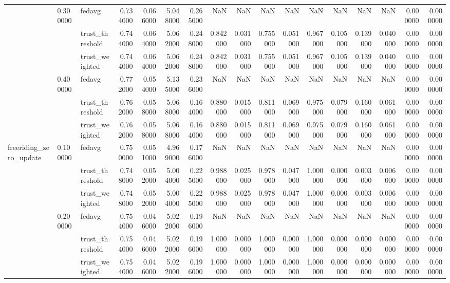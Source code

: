 \begin{tabular}{lllrrrrrrrrrrrrrr}
\cline{2-17}
 & \multirow[t]{3}{*}{0.300000} & fedavg & 0.734000 & 0.066000 & 5.048000 & 0.265000 & NaN & NaN & NaN & NaN & NaN & NaN & NaN & NaN & 0.000000 & 0.000000 \\
 &  & trust_threshold & 0.744000 & 0.064000 & 5.062000 & 0.248000 & 0.842000 & 0.031000 & 0.755000 & 0.051000 & 0.967000 & 0.105000 & 0.139000 & 0.040000 & 0.000000 & 0.000000 \\
 &  & trust_weighted & 0.744000 & 0.064000 & 5.062000 & 0.248000 & 0.842000 & 0.031000 & 0.755000 & 0.051000 & 0.967000 & 0.105000 & 0.139000 & 0.040000 & 0.000000 & 0.000000 \\
\cline{2-17}
 & \multirow[t]{3}{*}{0.400000} & fedavg & 0.772000 & 0.054000 & 5.135000 & 0.236000 & NaN & NaN & NaN & NaN & NaN & NaN & NaN & NaN & 0.000000 & 0.000000 \\
 &  & trust_threshold & 0.762000 & 0.058000 & 5.068000 & 0.164000 & 0.880000 & 0.015000 & 0.811000 & 0.069000 & 0.975000 & 0.079000 & 0.160000 & 0.061000 & 0.000000 & 0.000000 \\
 &  & trust_weighted & 0.762000 & 0.058000 & 5.068000 & 0.164000 & 0.880000 & 0.015000 & 0.811000 & 0.069000 & 0.975000 & 0.079000 & 0.160000 & 0.061000 & 0.000000 & 0.000000 \\
\cline{1-17} \cline{2-17}
\multirow[t]{12}{*}{freeriding_zero_update} & \multirow[t]{3}{*}{0.100000} & fedavg & 0.750000 & 0.051000 & 4.969000 & 0.176000 & NaN & NaN & NaN & NaN & NaN & NaN & NaN & NaN & 0.000000 & 0.000000 \\
 &  & trust_threshold & 0.748000 & 0.052000 & 5.004000 & 0.225000 & 0.988000 & 0.025000 & 0.978000 & 0.047000 & 1.000000 & 0.000000 & 0.003000 & 0.006000 & 0.000000 & 0.000000 \\
 &  & trust_weighted & 0.748000 & 0.052000 & 5.004000 & 0.225000 & 0.988000 & 0.025000 & 0.978000 & 0.047000 & 1.000000 & 0.000000 & 0.003000 & 0.006000 & 0.000000 & 0.000000 \\
\cline{2-17}
 & \multirow[t]{3}{*}{0.200000} & fedavg & 0.754000 & 0.046000 & 5.022000 & 0.196000 & NaN & NaN & NaN & NaN & NaN & NaN & NaN & NaN & 0.000000 & 0.000000 \\
 &  & trust_threshold & 0.754000 & 0.046000 & 5.022000 & 0.196000 & 1.000000 & 0.000000 & 1.000000 & 0.000000 & 1.000000 & 0.000000 & 0.000000 & 0.000000 & 0.000000 & 0.000000 \\
 &  & trust_weighted & 0.754000 & 0.046000 & 5.022000 & 0.196000 & 1.000000 & 0.000000 & 1.000000 & 0.000000 & 1.000000 & 0.000000 & 0.000000 & 0.000000 & 0.000000 & 0.000000 \\

\end{tabular}
